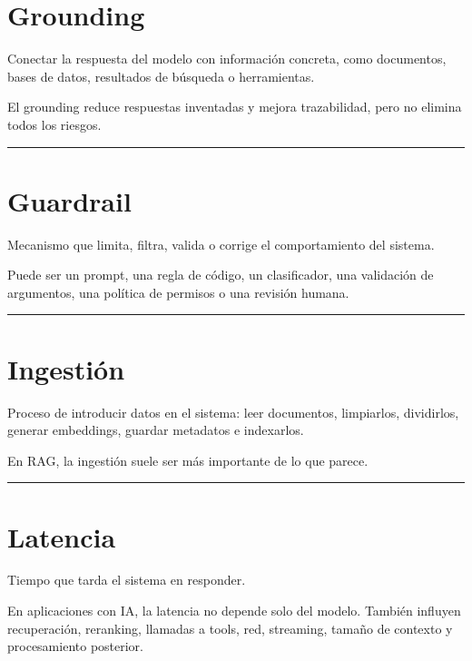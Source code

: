 \section{Grounding}\label{grounding}

Conectar la respuesta del modelo con información concreta, como
documentos, bases de datos, resultados de búsqueda o herramientas.

El grounding reduce respuestas inventadas y mejora trazabilidad, pero no
elimina todos los riesgos.

\begin{center}\rule{0.5\linewidth}{0.5pt}\end{center}

\section{Guardrail}\label{guardrail}

Mecanismo que limita, filtra, valida o corrige el comportamiento del
sistema.

Puede ser un prompt, una regla de código, un clasificador, una
validación de argumentos, una política de permisos o una revisión
humana.

\begin{center}\rule{0.5\linewidth}{0.5pt}\end{center}

\section{Ingestión}\label{ingestiuxf3n}

Proceso de introducir datos en el sistema: leer documentos, limpiarlos,
dividirlos, generar embeddings, guardar metadatos e indexarlos.

En RAG, la ingestión suele ser más importante de lo que parece.

\begin{center}\rule{0.5\linewidth}{0.5pt}\end{center}

\section{Latencia}\label{latencia-5}

Tiempo que tarda el sistema en responder.

En aplicaciones con IA, la latencia no depende solo del modelo. También
influyen recuperación, reranking, llamadas a tools, red, streaming,
tamaño de contexto y procesamiento posterior.

